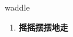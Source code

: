 
\begin{frame}
{\huge waddle}
\begin{center}
\begin{enumerate}\Large
  \item \textbf{摇摇摆摆地走}
\end{enumerate}
\end{center}
\end{frame}
